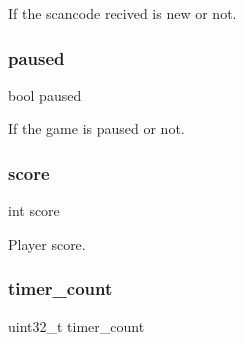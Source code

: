 If the scancode recived is new or not. 

\mbox{\label{group__Proj_ga1656129c4a4fd8809254194f08f0ac70}} 
\subsubsection{\texorpdfstring{paused}{paused}}
{\footnotesize\ttfamily bool paused}



If the game is paused or not. 

\mbox{\label{group__Proj_gaef160b7437d94056f1dc59646cd5b87d}} 
\subsubsection{\texorpdfstring{score}{score}}
{\footnotesize\ttfamily int score}



Player score. 

\mbox{\label{group__Proj_gae8397a27149e2f76643db0f712e30e82}} 
\subsubsection{\texorpdfstring{timer\+\_\+count}{timer\_count}}
{\footnotesize\ttfamily uint32\+\_\+t timer\+\_\+count}

